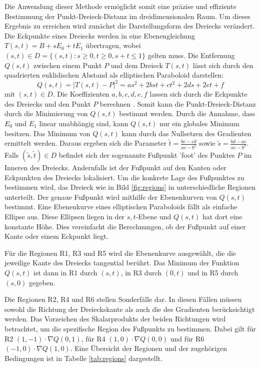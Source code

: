 \documentclass[conference]{IEEEtran}
\begin{document}
Die Anwendung dieser Methode ermöglicht somit eine präzise und effiziente Bestimmung der Punkt-Dreieck-Distanz im dreidimensionalen Raum. Um dieses Ergebnis zu erreichen wird zunächst die Darstellungsform des Dreiecks verändert. Die Eckpunkte eines Dreiecks werden in eine Ebenengleichung $ T(s,t) = B + sE_0 + tE_1 $ übertragen, wobei $(s, t) \in D = \{(s,t): s \geq 0, t \geq 0, s + t \leq 1 \}$ gelten muss. Die Entfernung $Q(s,t)$ zwischen einem Punkt $P$ und dem Dreieck $T(s,t)$ lässt sich durch den quadrierten euklidischen Abstand als elliptischen Paraboloid darstellen: 
\begin{equation}
    Q(s,t) = |T(s,t) - P|^2 = as^2 + 2bst + ct^2 + 2ds + 2et + f
\end{equation}
mit $(s,t) \in D$. Die Koeffizienten $a, b, c, d, e, f$ lassen sich durch die Eckpunkte des Dreiecks und den Punkt $P$ berechnen \autocite*{eberlyDistancePointTriangle}. Somit kann die Punkt-Dreieck-Distanz durch die Minimierung von $Q(s,t)$ bestimmt werden. Durch die Annahme, dass $E_0$ und $E_1$ linear unabhängig sind, kann $Q(s,t)$ nur ein globales Minimum besitzen. Das Minimum von $Q(s,t)$ kann durch das Nullsetzen des Gradienten ermittelt werden. Daraus ergeben sich die Parameter $\tilde{t} = \frac{be-cd}{ac-b^2}$ sowie $\tilde{s} = \frac{bd-ae}{ac-b^2}$. Falls $(\tilde{s}, \tilde{t}) \in D$ befindet sich der sogenannte Fußpunkt 'foot' des Punktes $P$ im Inneren des Dreiecks. Andernfalls ist der Fußpunkt auf den Kanten oder Eckpunkten des Dreiecks lokalisiert. Um die konkrete Lage des Fußpunktes zu bestimmen wird, das Dreieck wie in Bild \ref{fig:regions} in unterschiedliche Regionen unterteilt. Der genaue Fußpunkt wird mithilfe der Ebenenkurven von $Q(s, t)$ bestimmt. Eine Ebenenkurve eines elliptischen Paraboloids fällt als einfache Ellipse aus. Diese Ellipsen liegen in der $s, t$-Ebene und $Q(s, t)$ hat dort eine konstante Höhe. Dies vereinfacht die Berechnungen, ob der Fußpunkt auf einer Kante oder einem Eckpunkt liegt. 

Für die Regionen R1, R3 und R5 wird die Ebenenkurve ausgewählt, die die jeweilige Kante des Dreiecks tangential berührt. Das Minimum der Funktion $Q(s,t)$ ist dann in R1 durch $(s,t)$, in R3 durch $(0,t)$ und in R5 durch $(s,0)$ gegeben.

Die Regionen R2, R4 und R6 stellen Sonderfälle dar. In diesen Fällen müssen sowohl die Richtung der Dreieckskante als auch die des Gradienten berücksichtigt werden. Das Vorzeichen des Skalarprodukts der beiden Richtungen wird betrachtet, um die spezifische Region des Fußpunkts zu bestimmen. Dabei gilt für R2 $(1,-1)\cdot \nabla Q(0,1)$, für R4 $(1,0)\cdot\nabla Q(0,0)$ und für R6 $(-1,0)\cdot\nabla Q(1,0)$. Eine Übersicht der Regionen und der zugehörigen Bedingungen ist in Tabelle \ref{tab:regions} dargestellt.
\end{document}
